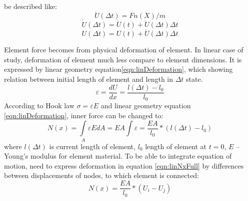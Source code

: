 be described like:
\begin{equation}\label{eqn:Accel}
  \ddot{U}(\Delta t)=Fn(X)/m
\end{equation}
\begin{equation}\label{eqn:Velos}
  \dot{U}(\Delta t)=\dot{U}(t)+\ddot{U}(\Delta t)\Delta t
\end{equation}
\begin{equation}\label{eqn:Displ}
  U(\Delta t)=U(t)+\dot{U}(\Delta t)\Delta t
\end{equation}
\par Element force becomes from physical deformation of
element. In linear case of study, deformation of element much less compare to
element dimensions. It is expressed by linear geometry
equation\eqref{eqn:linDeformation}, which showing relation between initial
length of element and length in $\Delta t$ state.
\begin{equation}\label{eqn:linDeformation}
  \varepsilon=\frac{dU}{dx}=\frac{l(\Delta t)-l_0}{l_0}
\end{equation}
According to Hook law $\sigma=\varepsilon E$ and linear geometry equation
\eqref{eqn:linDeformation}, inner force can be changed to:
\begin{equation}\label{eqn:linNxFull}
  N(x)= \int\limits_A \varepsilon EdA=EA\int \varepsilon=\frac{EA}{l_0}*(l(\Delta t)-l_0)
\end{equation}
where $l(\Delta t)$ is current length of element, $l_0$ length of element at
$t=0$, $E$ – Young’s modulus for element material. To be able to integrate
equation of motion, need to express deformation in equation
\eqref{eqn:linNxFull} by differences between displacements of nodes, to which
element is connected:
\begin{equation}\label{eqn:linNxWdispl}
  N(x)=\frac{EA}{l_0}*(U_{i}-U_{j})
\end{equation}\par
